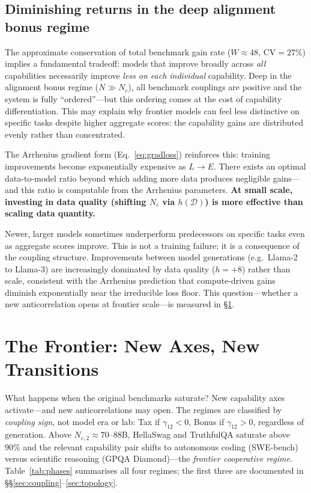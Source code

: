 \documentclass[11pt]{article}
\begin{document}
\subsection{Diminishing returns in the deep alignment bonus regime}

The approximate conservation of total benchmark gain rate
($W \approx 48$, CV$=27\%$) implies a fundamental tradeoff:
models that improve broadly across \emph{all} capabilities
necessarily improve \emph{less on each individual} capability.
Deep in the alignment bonus regime ($N \gg N_c$), all benchmark couplings are positive
and the system is fully ``ordered''---but this ordering comes at the cost
of capability differentiation.
This may explain why frontier models can feel less distinctive
on specific tasks despite higher aggregate scores:
the capability gains are distributed evenly rather than concentrated.

The Arrhenius gradient form (Eq.~\ref{eq:gradloss}) reinforces this:
training improvements become exponentially expensive as $L \to E$.
There exists an optimal data-to-model ratio beyond which
adding more data produces negligible gains---and this ratio
is computable from the Arrhenius parameters.
\textbf{At small scale, investing in data quality
(shifting $N_c$ via $h(\mathcal{D})$)
is more effective than scaling data quantity.}

Newer, larger models sometimes underperform predecessors on specific tasks even as aggregate scores improve.
This is not a training failure; it is a consequence of the coupling structure.
Improvements between model generations (e.g.\ Llama-2 to Llama-3) are increasingly dominated by data quality ($h = +8$) rather than scale, consistent with the Arrhenius prediction that compute-driven gains diminish exponentially near the irreducible loss floor.
This question---whether a new anticorrelation opens at frontier scale---is measured in \S\ref{sec:Nc2_section}.

\section{The Frontier: New Axes, New Transitions}
\label{sec:Nc2_section}

What happens when the original benchmarks saturate?
New capability axes activate---and new anticorrelations may open.
The regimes are classified by \emph{coupling sign}, not model era or lab: Tax if $\gamma_{12}<0$, Bonus if $\gamma_{12}>0$, regardless of generation. Above $N_{c,2} \approx 70$--$88$B, HellaSwag and TruthfulQA saturate above 90\% and the relevant capability pair shifts to autonomous coding (SWE-bench) versus scientific reasoning (GPQA Diamond)---the \emph{frontier cooperative regime}.
Table~\ref{tab:phases} summarises all four regimes; the first three are documented in \S\S\ref{sec:coupling}--\ref{sec:topology}.
\end{document}
